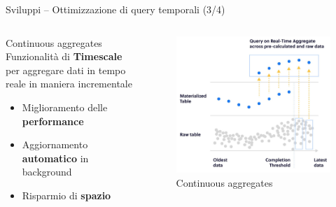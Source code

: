 \begin{frame}{Sviluppi – Ottimizzazione di query temporali (3/4)}

\begin{columns}

\begin{column}{0.45\textwidth}
\begin{block}{Continuous aggregates}
Funzionalità di \textbf{Timescale} per aggregare dati in tempo reale in maniera incrementale

\begin{itemize}
  \item Miglioramento delle \textbf{performance}
  \item Aggiornamento \textbf{automatico} in background
  \item Risparmio di \textbf{spazio}\vspace{0.1cm}
\end{itemize}
\end{block}
\end{column}

\begin{column}{0.55\textwidth}
\begin{figure}[H]
\centering
\captionsetup{justification=centering}
\includegraphics[width=\textwidth]{images/continuous_aggregates_r}
\caption{Continuous aggregates}
\end{figure}
\end{column}

\end{columns}

\end{frame}

